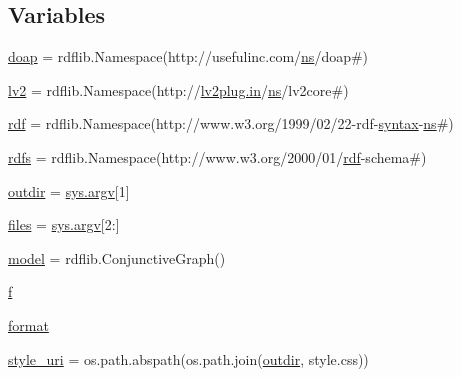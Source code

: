 \subsection*{Variables}
\begin{DoxyCompactItemize}
\item 
\hyperlink{namespacelv2docgen_a087b4f03c6a2406454850630dfa612d3}{doap} = rdflib.\+Namespace(\textquotesingle{}http\+://usefulinc.\+com/\hyperlink{xmltok_8c_ab6aec1346fb6c7b2733f0f73c9536ad2}{ns}/doap\#\textquotesingle{})
\item 
\hyperlink{namespacelv2docgen_a9009471fe4bb1cea6073a223e6418b5a}{lv2} = rdflib.\+Namespace(\textquotesingle{}http\+://\hyperlink{latency_8c_a7d946209d777cb95fe30364b8d321207}{lv2plug.\+in}/\hyperlink{xmltok_8c_ab6aec1346fb6c7b2733f0f73c9536ad2}{ns}/lv2core\#\textquotesingle{})
\item 
\hyperlink{namespacelv2docgen_afca3a2919bd7c9bef9f07c7d7286122d}{rdf} = rdflib.\+Namespace(\textquotesingle{}http\+://www.\+w3.\+org/1999/02/22-\/rdf-\/\hyperlink{cmdline_8c_a9aea52a77da0039230114dcf40c98aa6}{syntax}-\/\hyperlink{xmltok_8c_ab6aec1346fb6c7b2733f0f73c9536ad2}{ns}\#\textquotesingle{})
\item 
\hyperlink{namespacelv2docgen_a2c4f1023b8c871bcdc6b47859ad0d9a1}{rdfs} = rdflib.\+Namespace(\textquotesingle{}http\+://www.\+w3.\+org/2000/01/\hyperlink{namespacelv2docgen_afca3a2919bd7c9bef9f07c7d7286122d}{rdf}-\/schema\#\textquotesingle{})
\item 
\hyperlink{namespacelv2docgen_aac93b4f696d4d83b93b68db08de2a9e0}{outdir} = \hyperlink{cmdline_8c_ad407d5ba91709bd9b092003858600723}{sys.\+argv}\mbox{[}1\mbox{]}
\item 
\hyperlink{namespacelv2docgen_a2be4ec33b98834ddad6dbf8e8779cfb9}{files} = \hyperlink{cmdline_8c_ad407d5ba91709bd9b092003858600723}{sys.\+argv}\mbox{[}2\+:\mbox{]}
\item 
\hyperlink{namespacelv2docgen_ae1e22ed57f3a6f2ae8a8135e1bd15b37}{model} = rdflib.\+Conjunctive\+Graph()
\item 
\hyperlink{namespacelv2docgen_a6b416b5176666c9c2ddcfcecf2e40dc3}{f}
\item 
\hyperlink{namespacelv2docgen_a2b91455cd6425494b5dd21b4662ae441}{format}
\item 
\hyperlink{namespacelv2docgen_aa8202cda5fd7a4be38bce51b21fed0c0}{style\+\_\+uri} = os.\+path.\+abspath(os.\+path.\+join(\hyperlink{namespacelv2docgen_aac93b4f696d4d83b93b68db08de2a9e0}{outdir}, \textquotesingle{}style.\+css\textquotesingle{}))
\item 

\end{DoxyCompactItemize}
